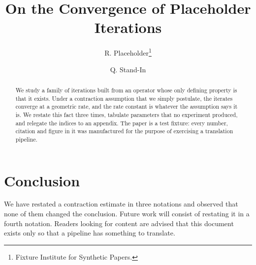 \documentclass[11pt,a4paper]{article}
\title{On the Convergence of Placeholder Iterations}
\author{R. Placeholder\thanks{Fixture Institute for Synthetic Papers.}
  \and Q. Stand-In}
\date{}
\begin{document}
\maketitle

\begin{abstract}
We study a family of iterations built from an operator whose only defining
property is that it exists.  Under a contraction assumption that we simply
postulate, the iterates converge at a geometric rate, and the rate constant is
whatever the assumption says it is.  We restate this fact three times, tabulate
parameters that no experiment produced, and relegate the indices to an
appendix.  The paper is a test fixture: every number, citation and figure in it
was manufactured for the purpose of exercising a translation pipeline.
\end{abstract}





\section{Conclusion}
\label{sec:conclusion}

We have restated a contraction estimate in three notations and observed that
none of them changed the conclusion.  Future work will consist of restating it
in a fourth notation.  Readers looking for content are advised that this
document exists only so that a pipeline has something to translate.

\appendix




\end{document}

